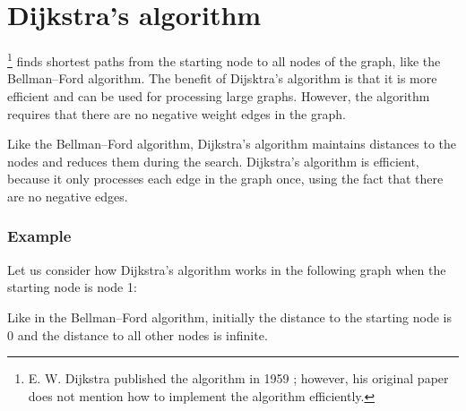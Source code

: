 \section{Dijkstra's algorithm}


\footnote{E. W. Dijkstra published the algorithm in 1959 \cite{dij59};
however, his original paper does not mention how to implement the algorithm efficiently.}
finds shortest
paths from the starting node to all nodes of the graph,
like the Bellman–Ford algorithm.
The benefit of Dijsktra's algorithm is that
it is more efficient and can be used for
processing large graphs.
However, the algorithm requires that there
are no negative weight edges in the graph.

Like the Bellman–Ford algorithm,
Dijkstra's algorithm maintains distances
to the nodes and reduces them during the search.
Dijkstra's algorithm is efficient, because
it only processes
each edge in the graph once, using the fact
that there are no negative edges.

\subsubsection{Example}

Let us consider how Dijkstra's algorithm
works in the following graph when the
starting node is node 1:
\begin{center}
\end{center}
Like in the Bellman–Ford algorithm,
initially the distance to the starting node is 0
and the distance to all other nodes is infinite.

